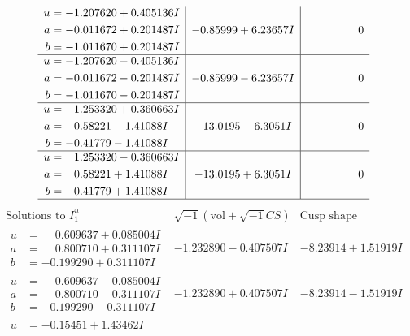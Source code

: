 \documentclass[1p]{elsarticle_modified}
\theoremstyle{definition}
\newcommand{\I}{\sqrt{-1}}
\begin{document}
$$\begin{array}{c|c|c}
\begin{aligned}
u &= -1.207620 + 0.405136 I \\
a &= -0.011672 + 0.201487 I \\
b &= -1.011670 + 0.201487 I\end{aligned}
 & -0.85999 + 6.23657 I & \phantom{-0.000000 } 0 \\ \hline\begin{aligned}
u &= -1.207620 - 0.405136 I \\
a &= -0.011672 - 0.201487 I \\
b &= -1.011670 - 0.201487 I\end{aligned}
 & -0.85999 - 6.23657 I & \phantom{-0.000000 } 0 \\ \hline\begin{aligned}
u &= \phantom{-}1.253320 + 0.360663 I \\
a &= \phantom{-}0.58221 - 1.41088 I \\
b &= -0.41779 - 1.41088 I\end{aligned}
 & -13.0195 - 6.3051 I & \phantom{-0.000000 } 0 \\ \hline\begin{aligned}
u &= \phantom{-}1.253320 - 0.360663 I \\
a &= \phantom{-}0.58221 + 1.41088 I \\
b &= -0.41779 + 1.41088 I\end{aligned}
 & -13.0195 + 6.3051 I & \phantom{-0.000000 } 0\\
 \hline 
 \end{array}$$\newpage$$\begin{array}{c|c|c}  
\text{Solutions to }I^u_{1}& \I (\text{vol} + \sqrt{-1}CS) & \text{Cusp shape}\\
 \hline 
\begin{aligned}
u &= \phantom{-}0.609637 + 0.085004 I \\
a &= \phantom{-}0.800710 + 0.311107 I \\
b &= -0.199290 + 0.311107 I\end{aligned}
 & -1.232890 - 0.407507 I & -8.23914 + 1.51919 I \\ \hline\begin{aligned}
u &= \phantom{-}0.609637 - 0.085004 I \\
a &= \phantom{-}0.800710 - 0.311107 I \\
b &= -0.199290 - 0.311107 I\end{aligned}
 & -1.232890 + 0.407507 I & -8.23914 - 1.51919 I \\ \hline\begin{aligned}
u &= -0.15451 + 1.43462 I \\

\end{aligned}
\end{array}$$
\end{document}
